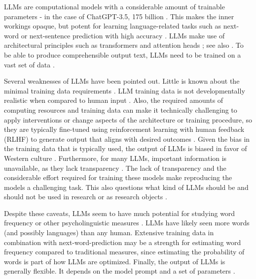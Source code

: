 \documentclass[doc, a4paper, anonymous]{apa7}
\begin{document}
LLMs are computational models with a considerable amount of trainable parameters - in the case of ChatGPT-3.5, 175 billion \citep{brown_language_2020}. This makes the inner workings opaque, but potent for learning language-related tasks such as next-word or next-sentence prediction with high accuracy \citep[e.g.,][]{devlin2019bertpretrainingdeepbidirectional}. LLMs make use of architectural principles such as transformers and attention heads \citep{vaswani_attention_2017}; see also \citep[for an introduction]{hussain_tutorial_2024}. To be able to produce comprehensible output text, LLMs need to be trained on a vast set of data \citep{bender_dangers_2021}. 

Several weaknesses of LLMs have been pointed out. Little is known about the minimal training data requirements \citep{hosseini_artificial_2022}. LLM training data is not developmentally realistic when compared to human input \citep{evanson_language_2023, warstadt_findings_2023, feng_is_2024}. Also, the required amounts of computing resources and training data can make it technically challenging to apply interventions or change aspects of the architecture or training procedure, so they are typically fine-tuned using reinforcement learning with human feedback (RLHF) to generate output that aligns with desired outcomes \citep[see][for how to remove troubling model outputs]{ouyang_training_2022}. Given the bias in the training data that is typically used, the output of LLMs is biased in favor of Western culture \citep{atari_which_2023}. Furthermore, for many LLMs, important information is unavailable, as they lack transparency \citep{liesenfeld_opening_2023, frank_openly_2023}. The lack of transparency and the considerable effort required for training these models make reproducing the models a challenging task. This also questions what kind of LLMs should be and should not be used in research or as research objects \citep{bender_dangers_2021, liesenfeld_opening_2023}. 

Despite these caveats, LLMs seem to have much potential for studying word frequency \citep{oh_frequency_2024} or other psycholinguistic measures \citep{martinez2024ai}. LLMs have likely seen more words (and possibly languages) than any human. Extensive training data in combination with next-word-prediction may be a strength for estimating word frequency compared to traditional measures, since estimating the probability of words is part of how LLMs are optimized. Finally, the output of LLMs is generally flexible. It depends on the model prompt and a set of parameters \citep[for the temperature parameter: higher values lead to greater lexical diversity in the generated text, similar to exploration in humans][]{momennejad_evaluating_2023}. 
\end{document}
